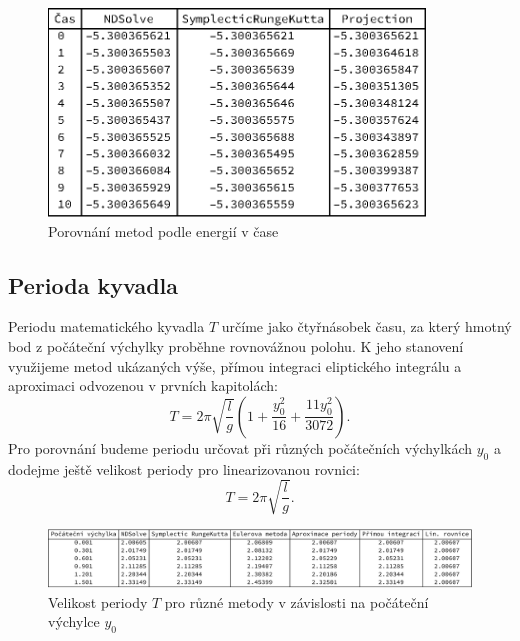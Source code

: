 \begin{description}
\begin{figure}[h]
  \centering
  \includegraphics[width=10cm]{figures/TAB1.eps}
  \caption{Porovnání metod podle energií v čase}
  \label{fig:tab}
\end{figure}



\end{description}

\subsection{Perioda kyvadla}
\label{sec:Perioda}

Periodu matematického kyvadla $T$ určíme jako čtyřnásobek času, za který hmotný bod z počáteční výchylky proběhne rovnovážnou polohu. K jeho stanovení využijeme metod ukázaných výše, přímou integraci eliptického integrálu a aproximaci odvozenou v prvních kapitolách:
\begin{equation}
\label{aproxperiod}
T= 2 \pi \sqrt{\frac{l}{g}} \left( 1 + \frac{y_{0}^{2}}{16} + \frac{11y_{0}^{2}}{3072} \right) .
\end{equation}
Pro porovnání budeme periodu určovat při různých počátečních výchylkách $y_{0}$ a dodejme ještě velikost periody pro linearizovanou rovnici:
\begin{equation}
\label{aproxperiod}
T= 2 \pi \sqrt{\frac{l}{g}}.
\end{equation}

\begin{figure}[h]
  \centering
  \includegraphics[width=17cm]{figures/perTab.pdf}
  \caption{Velikost periody $T$ pro různé metody v závislosti na počáteční výchylce $y_{0}$}
  \label{fig:pertab}
\end{figure}

